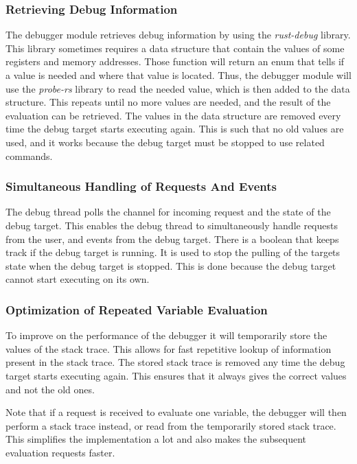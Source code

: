 \subsubsection{Retrieving Debug Information}
The debugger module retrieves debug information by using the \emph{rust-debug} library.
This library sometimes requires a data structure that contain the values of some registers and memory addresses.
Those function will return an enum that tells if a value is needed and where that value is located.
Thus, the debugger module will use the \emph{probe-rs} library to read the needed value, which is then added to the data structure.
This repeats until no more values are needed, and the result of the evaluation can be retrieved.
The values in the data structure are removed every time the debug target starts executing again.
This is such that no old values are used, and it works because the debug target must be stopped to use related commands.



\subsubsection{Simultaneous Handling of Requests And Events}
The debug thread polls the channel for incoming request and the state of the debug target.
This enables the debug thread to simultaneously handle requests from the user, and events from the debug target.
There is a boolean that keeps track if the debug target is running.
It is used to stop the pulling of the targets state when the debug target is stopped.
This is done because the debug target cannot start executing on its own.


\subsubsection{Optimization of Repeated Variable Evaluation}
To improve on the performance of the debugger it will temporarily store the values of the stack trace.
This allows for fast repetitive lookup of information present in the stack trace.
The stored stack trace is removed any time the debug target starts executing again.
This ensures that it always gives the correct values and not the old ones.


Note that if a request is received to evaluate one variable, the debugger will then perform a stack trace instead, or read from the temporarily stored stack trace.
This simplifies the implementation a lot and also makes the subsequent evaluation requests faster.


